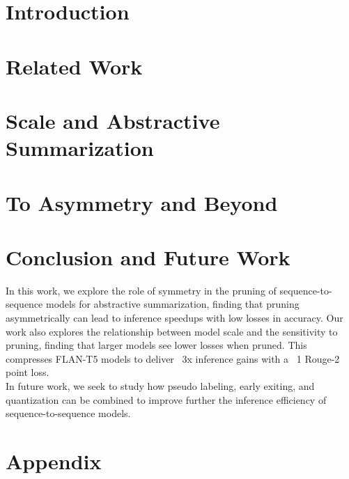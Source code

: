 \documentclass[11pt]{article}
\begin{document}
\section{Introduction}

\section{Related Work}

\section{Scale and Abstractive Summarization}

\section{To Asymmetry and Beyond}

\section{Conclusion and Future Work}
In this work, we explore the role of symmetry in the pruning of sequence-to-sequence models for abstractive summarization, finding that pruning asymmetrically can lead to inference speedups with low losses in accuracy. Our work also explores the relationship between model scale and the sensitivity to pruning, finding that larger models see lower losses when pruned. This compresses FLAN-T5 models to deliver ~3x inference gains with a ~1 Rouge-2 point loss. \\
In future work, we seek to study how pseudo labeling, early exiting, and quantization can be combined to improve further the inference efficiency of sequence-to-sequence models.  


\appendix
\section{Appendix}
\label{sec:appendix}

\end{document}
